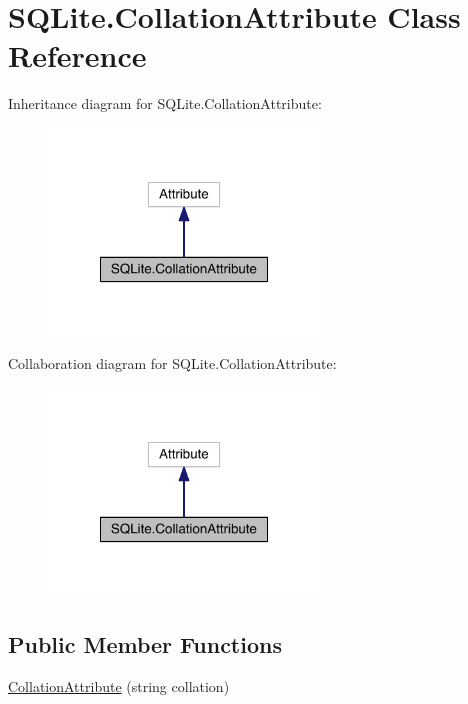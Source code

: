 \hypertarget{class_s_q_lite_1_1_collation_attribute}{\section{S\+Q\+Lite.\+Collation\+Attribute Class Reference}
\label{class_s_q_lite_1_1_collation_attribute}
}


Inheritance diagram for S\+Q\+Lite.\+Collation\+Attribute\+:
\nopagebreak
\begin{figure}[H]
\begin{center}
\leavevmode
\includegraphics[width=204pt]{class_s_q_lite_1_1_collation_attribute__inherit__graph}
\end{center}
\end{figure}


Collaboration diagram for S\+Q\+Lite.\+Collation\+Attribute\+:
\nopagebreak
\begin{figure}[H]
\begin{center}
\leavevmode
\includegraphics[width=204pt]{class_s_q_lite_1_1_collation_attribute__coll__graph}
\end{center}
\end{figure}
\subsection*{Public Member Functions}
\begin{DoxyCompactItemize}
\item 
\hyperlink{class_s_q_lite_1_1_collation_attribute_a741b7b18adbbefa4c7922d254c8a3afc}{Collation\+Attribute} (string collation)
\end{DoxyCompactItemize}
